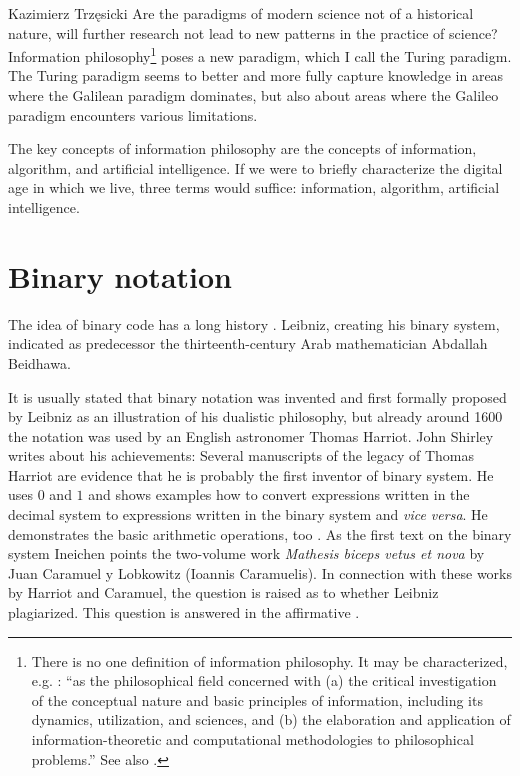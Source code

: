 \begin{artengenv}{Kazimierz Trzęsicki}
Are the paradigms of modern science not of a historical nature, will further research not lead to new patterns in the practice of science? Information philosophy\footnote{There is no one definition of information philosophy. It may be characterized, e.g.  \parencite[p.154]{Floridi2009}: ``as  the philosophical field concerned with (a) the critical investigation of the conceptual nature and basic principles of information, including its dynamics, utilization, and sciences, and (b) the elaboration and application of information-theoretic and computational methodologies to philosophical problems.'' See also \parencite{Floridi2002}.} poses a new paradigm, which I call the Turing paradigm. The Turing paradigm seems to better and more fully capture knowledge in areas where the Galilean paradigm dominates, but also about areas where the Galileo paradigm encounters various limitations.

The key concepts of information philosophy are the concepts of information, algorithm, and artificial intelligence. If we were to briefly characterize the digital age in which we live, three terms would suffice: information, algorithm, artificial intelligence.


\section{Binary notation} 

The idea of binary code has a long history \parencite{Ligonniere1992, Trzesicki2006b}. Leibniz, creating his binary system, indicated as predecessor  the thirteenth-century Arab mathematician Abdallah Beidhawa.

It is usually stated that binary notation was invented and first formally proposed by Leibniz as an illustration of his dualistic philosophy, but already around 1600 the notation was used by  an English astronomer Thomas Harriot. John Shirley \parencite*{Shirley1951} writes about his achievements:
Several manuscripts of the legacy of Thomas Harriot are evidence that he is probably the first inventor of binary system. He uses $0$ and $1$ and shows examples how to convert expressions  written in the decimal system to expressions written in the binary system and \emph{vice versa}. He demonstrates the basic arithmetic operations, too \parencite{Ineichen2008}. As the first text on the binary system Ineichen  points the two-volume work \emph{Mathesis biceps vetus et nova} \parencite*{Lobkowitz1670} by Juan Caramuel y Lobkowitz (Ioannis Caramuelis). In connection with these works by Harriot and Caramuel, the question is raised as to whether Leibniz plagiarized. This question is answered in the affirmative \parencite{Ares2018}.



\end{artengenv}
